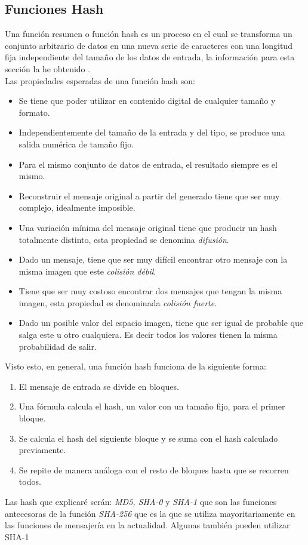 \begin{aligned*}
\section{Funciones Hash}
Una función resumen o función hash es un proceso en el cual se transforma un conjunto arbitrario de datos en una nueva serie de caracteres con una longitud fija independiente del tamaño de los datos de entrada, la información para esta sección la he obtenido \cite{aepd}.\\
Las propiedades esperadas de una función hash son:
\begin{itemize}
	\item Se tiene que poder utilizar en contenido digital de cualquier tamaño y formato.
	\item Independientemente del tamaño de la entrada y del tipo, se produce una salida numérica de tamaño fijo.
	\item Para el mismo conjunto de datos de entrada, el resultado siempre es el mismo.
	\item Reconstruir el mensaje original a partir del generado tiene que ser muy complejo, idealmente imposible.
	\item Una variación mínima del mensaje original tiene que producir un hash totalmente distinto, esta propiedad se denomina \emph{difusión}.
	\item Dado un mensaje, tiene que ser muy difícil encontrar otro mensaje con la misma imagen que este \emph{colisión débil}.
	\item Tiene que ser muy costoso encontrar dos mensajes que tengan la misma imagen, esta propiedad es denominada \emph{colisión fuerte}.
	\item Dado un posible valor del espacio imagen, tiene que ser igual de probable que salga este u otro cualquiera. Es decir todos los valores tienen la misma probabilidad de salir.
\end{itemize}

Visto esto, en general, una función hash funciona de la siguiente forma:
\begin{enumerate}
	\item El mensaje de entrada se divide en bloques.
	\item Una fórmula calcula el hash, un valor con un tamaño fijo, para el primer bloque.
	\item Se calcula el hash del siguiente bloque y se suma con el hash calculado previamente.
	\item Se repite de manera análoga con el resto de bloques hasta que se recorren todos.
\end{enumerate}
Las hash que explicaré serán: \emph{MD5, SHA-0} y \emph{SHA-1} que son las funciones antecesoras de la función \emph{SHA-256} que es la que se utiliza mayoritariamente en las funciones de mensajería en la actualidad. Algunas también pueden utilizar SHA-1\\


\end{aligned*}
